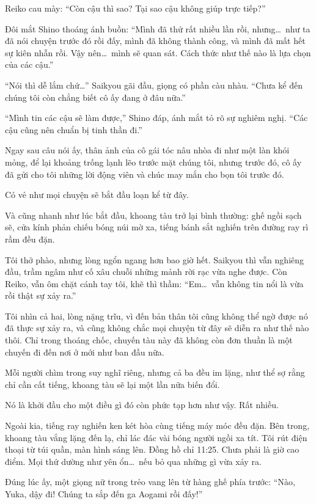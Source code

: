 \documentclass[../main.tex]{subfiles}
\begin{document}
Reiko cau mày: ``Còn cậu thì sao? Tại sao cậu không giúp trực tiếp?''

Đôi mắt Shino thoáng ánh buồn: ``Mình đã thử rất nhiều lần rồi, nhưng\dots\ như ta đã nói chuyện trước đó rồi đấy, mình đã không thành công, và mình đã mất hết sự kiên nhẫn rồi. Vậy nên\dots\ mình sẽ quan sát. Cách thức như thế nào là lựa chọn của các cậu.''

``Nói thì dễ lắm chứ\dots'' Saikyou gãi đầu, giọng có phần càu nhàu. ``Chưa kể đến chúng tôi còn chẳng biết cô ấy đang ở đâu nữa.''

``Mình tin các cậu sẽ làm được,'' Shino đáp, ánh mắt tỏ rõ sự nghiêm nghị. ``Các cậu cũng nên chuẩn bị tinh thần đi.''

Ngay sau câu nói ấy, thân ảnh của cô gái tóc nâu nhòa đi như một làn khói mỏng, để lại khoảng trống lạnh lẽo trước mặt chúng tôi, nhưng trước đó, cô ấy đã gửi cho tôi những lời động viên và chúc may mắn cho bọn tôi trước đó.

Có vẻ như mọi chuyện sẽ bắt đầu loạn kể từ đây.

Và cũng nhanh như lúc bắt đầu, khoang tàu trở lại bình thường: ghế ngồi sạch sẽ, cửa kính phản chiếu bóng núi mờ xa, tiếng bánh sắt nghiến trên đường ray rì rầm đều đặn.

Tôi thở phào, nhưng lòng ngổn ngang hơn bao giờ hết. Saikyou thì vẫn nghiêng đầu, trầm ngâm như cố xâu chuỗi những mảnh rời rạc vừa nghe được. Còn Reiko, vẫn ôm chặt cánh tay tôi, khẽ thì thầm: ``Em\dots\ vẫn không tin nổi là vừa rồi thật sự xảy ra.''

Tôi nhìn cả hai, lòng nặng trĩu, vì đến bản thân tôi cũng không thể ngờ được nó đã thực sự xảy ra, và cũng không chắc mọi chuyện từ đây sẽ diễn ra như thế nào thôi. Chỉ trong thoáng chốc, chuyến tàu này đã không còn đơn thuần là một chuyến đi đến nơi ở mới như ban đầu nữa.

Mỗi người chìm trong suy nghĩ riêng, nhưng cả ba đều im lặng, như thể sợ rằng chỉ cần cất tiếng, khoang tàu sẽ lại một lần nữa biến đổi.

Nó là khởi đầu cho một điều gì đó còn phức tạp hơn như vậy. Rất nhiều.

Ngoài kia, tiếng ray nghiến ken két hòa cùng tiếng máy móc đều đặn. Bên trong, khoang tàu vắng lặng đến lạ, chỉ lác đác vài bóng người ngồi xa tít. Tôi rút điện thoại từ túi quần, màn hình sáng lên. Đồng hồ chỉ 11:25. Chưa phải là giờ cao điểm. Mọi thứ dường như yên ổn\dots\ nếu bỏ qua những gì vừa xảy ra.

Đúng lúc ấy, một giọng nữ trong trẻo vang lên từ hàng ghế phía trước: ``Nào, Yuka, dậy đi! Chúng ta sắp đến ga Aogami rồi đấy!''
\end{document}
